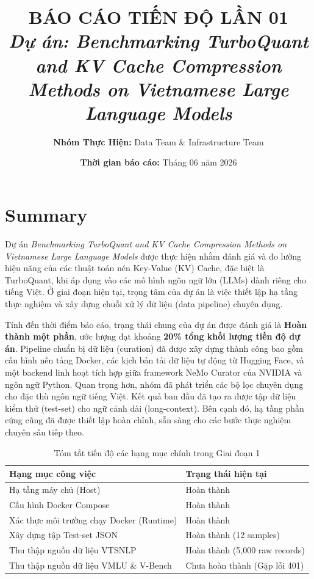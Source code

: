 ﻿\documentclass[12pt,a4paper]{article}
\title{\textbf{BÁO CÁO TIẾN ĐỘ LẦN 01}\\ 
\large \vspace{0.5cm} \textit{Dự án: Benchmarking TurboQuant and KV Cache Compression Methods on Vietnamese Large Language Models}}
\author{\textbf{Nhóm Thực Hiện:} Data Team \& Infrastructure Team}
\date{\textbf{Thời gian báo cáo:} Tháng 06 năm 2026}
\begin{document}
\maketitle
\newpage

\tableofcontents
\newpage

\section{Summary}

Dự án \textit{Benchmarking TurboQuant and KV Cache Compression Methods on Vietnamese Large Language Models} được thực hiện nhằm đánh giá và đo lường hiệu năng của các thuật toán nén Key-Value (KV) Cache, đặc biệt là TurboQuant, khi áp dụng vào các mô hình ngôn ngữ lớn (LLMs) dành riêng cho tiếng Việt. Ở giai đoạn hiện tại, trọng tâm của dự án là việc thiết lập hạ tầng thực nghiệm và xây dựng chuỗi xử lý dữ liệu (data pipeline) chuyên dụng. 

Tính đến thời điểm báo cáo, trạng thái chung của dự án được đánh giá là \textbf{Hoàn thành một phần}, ước lượng đạt khoảng \textbf{20\% tổng khối lượng tiến độ dự án}. Pipeline chuẩn bị dữ liệu (curation) đã được xây dựng thành công bao gồm cấu hình nền tảng Docker, các kịch bản tải dữ liệu tự động từ Hugging Face, và một backend linh hoạt tích hợp giữa framework NeMo Curator của NVIDIA và ngôn ngữ Python. Quan trọng hơn, nhóm đã phát triển các bộ lọc chuyên dụng cho đặc thù ngôn ngữ tiếng Việt. Kết quả ban đầu đã tạo ra được tập dữ liệu kiểm thử (test-set) cho ngữ cảnh dài (long-context). Bên cạnh đó, hạ tầng phần cứng cũng đã được thiết lập hoàn chỉnh, sẵn sàng cho các bước thực nghiệm chuyên sâu tiếp theo.

\begin{table}[H]
\centering
\begin{tabular}{@{}ll@{}}
\toprule
\textbf{Hạng mục công việc} & \textbf{Trạng thái hiện tại} \\ \midrule
Hạ tầng máy chủ (Host) & Hoàn thành \\
Cấu hình Docker Compose & Hoàn thành \\
Xác thực môi trường chạy Docker (Runtime) & Hoàn thành \\
Xây dựng tập Test-set JSON & Hoàn thành (12 samples) \\
Thu thập nguồn dữ liệu VTSNLP & Hoàn thành (5,000 raw records) \\
Thu thập nguồn dữ liệu VMLU \& V-Bench & Chưa hoàn thành (Gặp lỗi 401) \\ \bottomrule
\end{tabular}
\caption{Tóm tắt tiến độ các hạng mục chính trong Giai đoạn 1}
\end{table}
\end{document}
